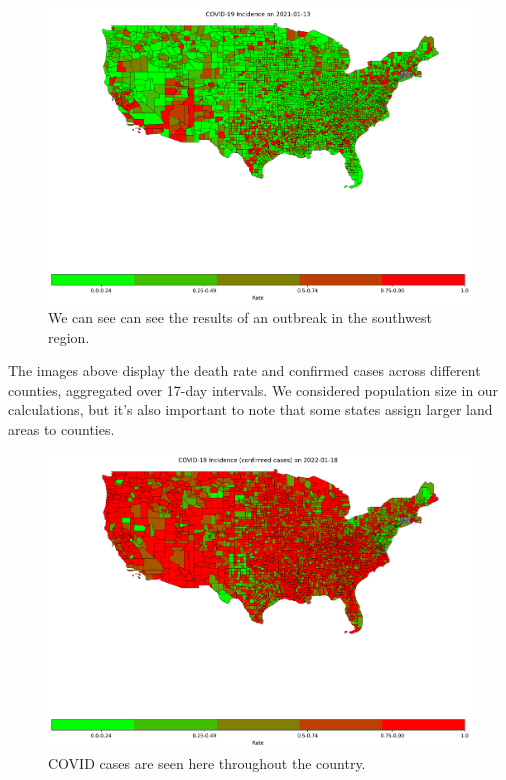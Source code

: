 \documentclass[sigconf,screen,nonacm]{acmart}
\begin{document}
\begin{figure}[H]
  \centering
  \includegraphics[width=.8\linewidth]{Figures/IncidenceDeathRate_2021-01-13.png}
  
  \caption{We can see can see the results of an outbreak in the southwest region.}
\end{figure}



The images above display the death rate and confirmed cases across different counties, aggregated over 17-day intervals. We considered population size in our calculations, but it's also important to note that some states assign larger land areas to counties.

\begin{figure}[h]
  \centering
  \includegraphics[width=.8\linewidth]{Figures/IncidenceRate_covidCase_2022-01-18.png}
  
  \caption{COVID cases are seen here throughout the country.}
\end{figure}
\end{document}
